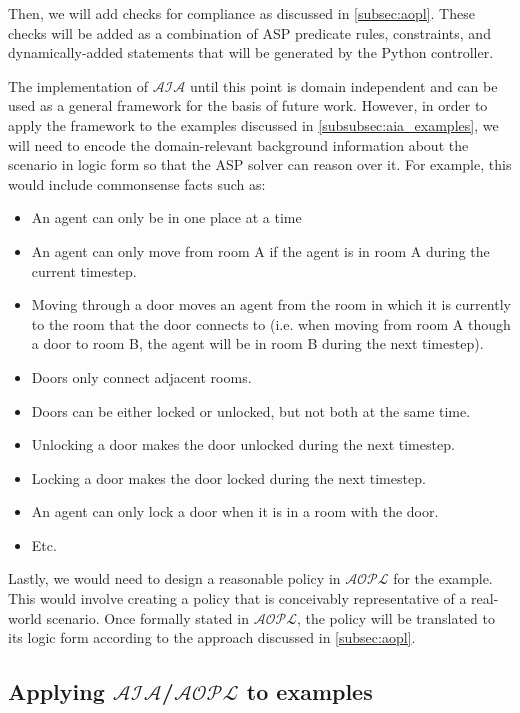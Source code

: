Then, we will add checks for compliance as discussed in \cref{subsec:aopl}.
These checks will be added as a combination of ASP predicate rules, constraints, and dynamically-added statements that will be generated by the Python controller.

The implementation of $\mathcal{AIA}$ until this point is domain independent and can be used as a general framework for the basis of future work.
However, in order to apply the framework to the examples discussed in \cref{subsubsec:aia_examples}, we will need to encode the domain-relevant background information about the scenario in logic form so that the ASP solver can reason over it.
For example, this would include commonsense facts such as:

\begin{itemize}
    \item An agent can only be in one place at a time
    \item An agent can only move from room A if the agent is in room A during the current timestep.
    \item Moving through a door moves an agent from the room in which it is currently to the room that the door connects to (i.e. when moving from room A though a door to room B, the agent will be in room B during the next timestep).
    \item Doors only connect adjacent rooms.
    \item Doors can be either locked or unlocked, but not both at the same time.
    \item Unlocking a door makes the door unlocked during the next timestep.
    \item Locking a door makes the door locked during the next timestep.
    \item An agent can only lock a door when it is in a room with the door.
    \item Etc.
\end{itemize}

Lastly, we would need to design a reasonable policy in $\mathcal{AOPL}$ for the example.
This would involve creating a policy that is conceivably representative of a real-world scenario.
Once formally stated in $\mathcal{AOPL}$, the policy will be translated to its logic form according to the approach discussed in \cref{subsec:aopl}.

\subsection{Applying $\mathcal{AIA}$/$\mathcal{AOPL}$ to examples}

